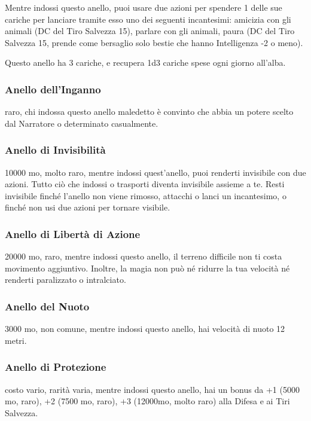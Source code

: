 \begin{multicols}{2}
	Mentre indossi questo anello, puoi usare due azioni per spendere 1 delle sue cariche per lanciare tramite esso uno dei seguenti incantesimi: amicizia con gli animali (DC del Tiro Salvezza 15), parlare con gli animali, paura (DC del Tiro Salvezza 15, prende come bersaglio solo bestie che hanno Intelligenza -2 o meno).

	Questo anello ha 3 cariche, e recupera 1d3 cariche spese ogni giorno all'alba.

	\subsubsection*{Anello dell’Inganno}
	raro, chi indossa questo anello maledetto è convinto che abbia un potere scelto dal Narratore o determinato casualmente.

	\subsubsection*{Anello di Invisibilità}
	10000 mo, molto raro, mentre indossi quest'anello, puoi renderti invisibile con due azioni. Tutto ciò che indossi o trasporti diventa invisibile assieme a te. Resti invisibile finché l'anello non viene rimosso, attacchi o lanci un incantesimo, o finché non usi due azioni per tornare visibile.

	\subsubsection*{Anello di Libertà di Azione}
	20000 mo, raro, mentre indossi questo anello, il terreno difficile non ti costa movimento aggiuntivo. Inoltre, la magia non può né ridurre la tua velocità né renderti paralizzato o intralciato.

	\subsubsection*{Anello del Nuoto}
	3000 mo, non comune, mentre indossi questo anello, hai velocità di nuoto 12 metri.

	\subsubsection*{Anello di Protezione}
	costo vario, rarità varia, mentre indossi questo anello, hai un bonus da +1 (5000 mo, raro), +2 (7500 mo, raro), +3 (12000mo, molto raro) alla Difesa e ai Tiri Salvezza.


\end{multicols}
